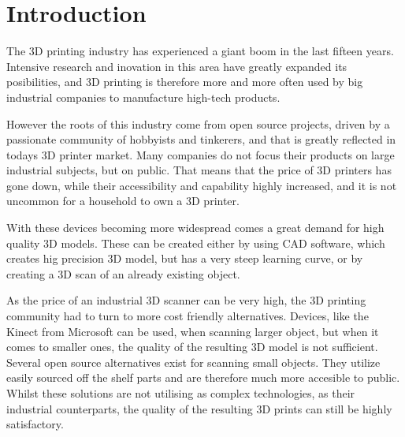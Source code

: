 \chapter{Introduction}
\label{sec:Introduction}
The 3D printing industry has experienced a giant boom in the last fifteen years.
Intensive research and inovation in this area have greatly expanded its posibilities, and 3D printing is therefore more and more often used by big industrial companies to manufacture high-tech products.

However the roots of this industry come from open source projects, driven by a passionate community of hobbyists and tinkerers, and that is greatly reflected in todays 3D printer market.
Many companies do not focus their products on large industrial subjects, but on public. That means that the price of 3D printers has gone down, while their accessibility and capability highly increased, and it is not uncommon for a household to own a 3D printer.

With these devices becoming more widespread comes a great demand for high quality 3D models.
These can be created either by using CAD software, which creates hig precision 3D model, but has a very steep learning curve, or by creating a 3D scan of an already existing object.

As the price of an industrial 3D scanner can be very high, the 3D printing community had to turn to more cost friendly alternatives.
Devices, like the Kinect from Microsoft can be used, when scanning larger object, but when it comes to smaller ones, the quality of the resulting 3D model is not sufficient.
Several open source alternatives exist for scanning small objects.
They utilize easily sourced off the shelf parts and are therefore much more accesible to public.
Whilst these solutions are not utilising as complex technologies, as their industrial counterparts, the quality of the resulting 3D prints can still be highly satisfactory.



\endinput